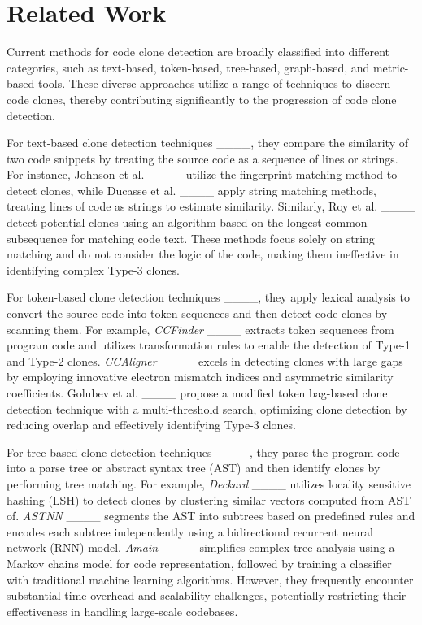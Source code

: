 \section{Related Work}
Current methods for code clone detection are broadly classified into different categories, such as text-based, token-based, tree-based, graph-based, and metric-based tools. 
 These diverse approaches utilize a range of techniques to discern code clones, thereby contributing significantly to the progression of code clone detection.

For text-based clone detection techniques ____, they compare the similarity of two code snippets by treating the source code as a sequence of lines or strings. 
For instance, Johnson et al. ____ utilize the fingerprint matching method to detect clones, while Ducasse et al. ____ apply string matching methods, treating lines of code as strings to estimate similarity. 
Similarly, Roy et al. ____ detect potential clones using an algorithm based on the longest common subsequence for matching code text. 
These methods focus solely on string matching and do not consider the logic of the code, making them ineffective in identifying complex Type-3 clones.

For token-based clone detection techniques ____, they apply lexical analysis to convert the source code into token sequences and then detect code clones by scanning them. 
For example, \emph{CCFinder} ____ extracts token sequences from program code and utilizes transformation rules to enable the detection of Type-1 and Type-2 clones. 
\emph{CCAligner} ____ excels in detecting clones with large gaps by employing innovative electron mismatch indices and asymmetric similarity coefficients. 
Golubev et al. ____ propose a modified token bag-based clone detection technique with a multi-threshold search, optimizing clone detection by reducing overlap and effectively identifying Type-3 clones. 

For tree-based clone detection techniques ____, they parse the program code into a parse tree or abstract syntax tree (AST) and then identify clones by performing tree matching. 
For example, \emph{Deckard} ____ utilizes locality sensitive hashing (LSH) to detect clones by clustering similar vectors computed from AST of. 
\emph{ASTNN} ____ segments the AST into subtrees based on predefined rules and encodes each subtree independently using a bidirectional recurrent neural network (RNN) model.
\emph{Amain} ____ simplifies complex tree analysis using a Markov chains model for code representation, followed by training a classifier with traditional machine learning algorithms.
However, they frequently encounter substantial time overhead and scalability challenges, potentially restricting their effectiveness in handling large-scale codebases.

